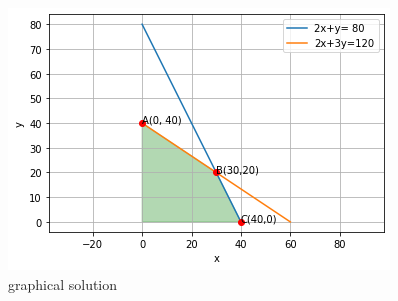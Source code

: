 \begin{figure}[!ht]
\centering
\includegraphics[width=\columnwidth]{solutions/su2021/2/16/Figure 11.png}
\caption{graphical solution}
\label{opt/16/fig: graphical solution}	
\end{figure}
